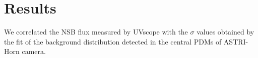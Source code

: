 \section{Results}
\label{sect:results} 
We  correlated the NSB flux measured by UVscope with the $\sigma$ values obtained by the fit of the background distribution detected in the central PDMs of ASTRI-Horn camera.


